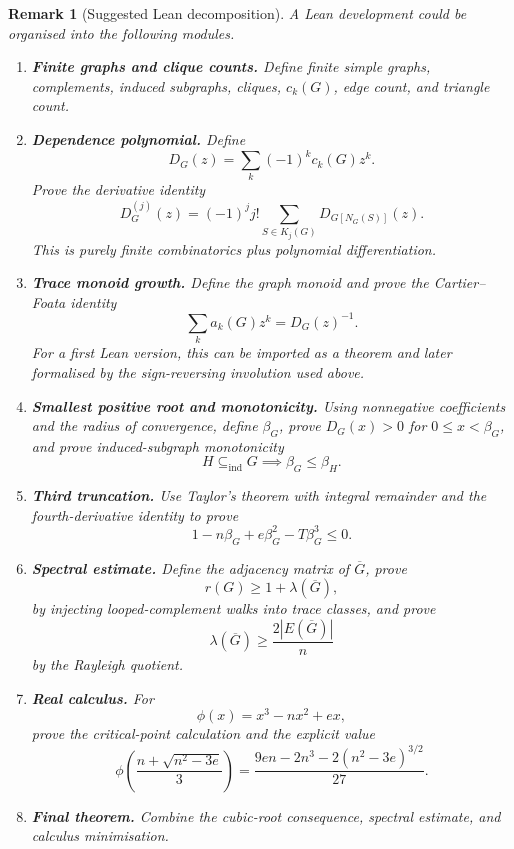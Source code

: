 \documentclass[11pt]{article}
\newtheorem{remark}[theorem]{Remark}
\newcommand{\E}{E}
\begin{document}
\begin{remark}[Suggested Lean decomposition]
A Lean development could be organised into the following modules.

\begin{enumerate}[label=\textbf{Module \arabic*.}, leftmargin=2.5cm]

\item \textbf{Finite graphs and clique counts.}
Define finite simple graphs, complements, induced subgraphs, cliques, \(c_k(G)\),
edge count, and triangle count.

\item \textbf{Dependence polynomial.}
Define
\[
        D_G(z)=\sum_k(-1)^k c_k(G)z^k.
\]
Prove the derivative identity
\[
        D_G^{(j)}(z)
        =
        (-1)^j j!
        \sum_{S\in K_j(G)}
        D_{G[N_G(S)]}(z).
\]
This is purely finite combinatorics plus polynomial differentiation.

\item \textbf{Trace monoid growth.}
Define the graph monoid and prove the Cartier--Foata identity
\[
        \sum_k a_k(G)z^k = D_G(z)^{-1}.
\]
For a first Lean version, this can be imported as a theorem and later formalised by the
sign-reversing involution used above.

\item \textbf{Smallest positive root and monotonicity.}
Using nonnegative coefficients and the radius of convergence, define \(\beta_G\), prove
\(D_G(x)>0\) for \(0\le x<\beta_G\), and prove induced-subgraph monotonicity
\[
        H\subseteq_{\mathrm{ind}}G
        \implies
        \beta_G\le\beta_H.
\]

\item \textbf{Third truncation.}
Use Taylor's theorem with integral remainder and the fourth-derivative identity to prove
\[
        1-n\beta_G+e\beta_G^2-T\beta_G^3\le 0.
\]

\item \textbf{Spectral estimate.}
Define the adjacency matrix of \(\overline G\), prove
\[
        r(G)\ge 1+\lambda(\overline G),
\]
by injecting looped-complement walks into trace classes, and prove
\[
        \lambda(\overline G)\ge \frac{2|\E(\overline G)|}{n}
\]
by the Rayleigh quotient.

\item \textbf{Real calculus.}
For
\[
        \phi(x)=x^3-nx^2+ex,
\]
prove the critical-point calculation and the explicit value
\[
        \phi\left(\frac{n+\sqrt{n^2-3e}}{3}\right)
        =
        \frac{9en-2n^3-2(n^2-3e)^{3/2}}{27}.
\]

\item \textbf{Final theorem.}
Combine the cubic-root consequence, spectral estimate, and calculus minimisation.

\end{enumerate}
\end{remark}
\end{document}
